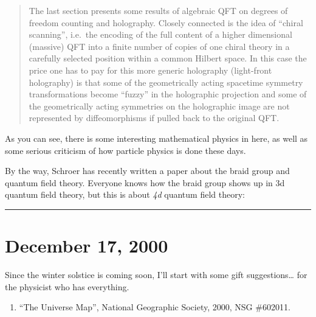 \documentclass{article}
\def\tightlist{}
\renewcommand{\texttt}[1]{%
  \begingroup
  \ttfamily
  \begingroup\lccode`~=`/\lowercase{\endgroup\def~}{/\discretionary{}{}{}}%
  \begingroup\lccode`~=`[\lowercase{\endgroup\def~}{[\discretionary{}{}{}}%
  \begingroup\lccode`~=`.\lowercase{\endgroup\def~}{.\discretionary{}{}{}}%
  \catcode`/=\active\catcode`[=\active\catcode`.=\active
  \scantokens{#1\noexpand}%
  \endgroup
}
\begin{document}
\begin{quote}
The last section presents some results of algebraic QFT on degrees of
freedom counting and holography. Closely connected is the idea of
``chiral scanning'', i.e.~the encoding of the full content of a higher
dimensional (massive) QFT into a finite number of copies of one chiral
theory in a carefully selected position within a common Hilbert space.
In this case the price one has to pay for this more generic holography
(light-front holography) is that some of the geometrically acting
spacetime symmetry transformations become ``fuzzy'' in the holographic
projection and some of the geometrically acting symmetries on the
holographic image are not represented by diffeomorphisms if pulled back
to the original QFT.
\end{quote}

As you can see, there is some interesting mathematical physics in here,
as well as some serious criticism of how particle physics is done these
days.

By the way, Schroer has recently written a paper about the braid group
and quantum field theory. Everyone knows how the braid group shows up in
3d quantum field theory, but this is about \emph{4d} quantum field
theory:


\begin{center}\rule{0.5\linewidth}{0.5pt}\end{center}



\hypertarget{week162}{%
\section{December 17, 2000}\label{week162}}

Since the winter solstice is coming soon, I'll start with some gift
suggestions\ldots{} for the physicist who has everything.

\begin{enumerate}
\def\labelenumi{\arabic{enumi})}
\tightlist
\item
  ``The Universe Map'', National Geographic Society, 2000, NSG \#602011.
\end{enumerate}
\end{document}
